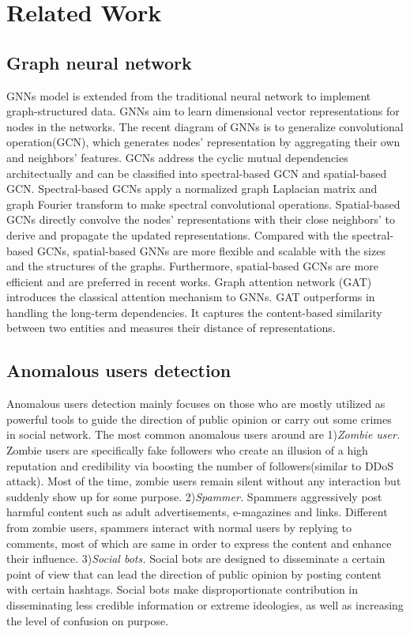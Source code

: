 \documentclass[conference]{IEEEtran}
\theoremstyle{definition}
\begin{document}
\section{Related Work}\label{sec:related}
\subsection{Graph neural network}
GNNs\cite{scarselli2008graph} model is extended from the traditional neural network to implement graph-structured data. GNNs aim to learn  dimensional vector representations for nodes in the networks. The recent diagram of GNNs is to generalize convolutional operation(GCN)\cite{peng2019hierarchical}, which generates nodes' representation by aggregating their own and neighbors' features. GCNs address the cyclic mutual dependencies architectually and can be classified into spectral-based GCN and spatial-based GCN. Spectral-based GCNs\cite{peng2019fine} apply a normalized graph Laplacian matrix and graph Fourier transform to make spectral convolutional operations. Spatial-based GCNs directly convolve the nodes' representations with their close neighbors' to derive and propagate the updated representations. Compared with the spectral-based GCNs, spatial-based GNNs are more flexible and scalable with the sizes and the structures of the graphs. Furthermore, spatial-based GCNs are more efficient and are preferred in recent works\cite{peng2021lime}. Graph attention network (GAT)~\cite{GAT} introduces the classical attention  mechanism to GNNs. GAT outperforms in handling the long-term dependencies. It captures the content-based similarity between two entities and measures their distance of representations\cite{peng2019hierarchical,cao2021knowledge,peng2020motif}.

\subsection{Anomalous users detection}
Anomalous users detection mainly focuses on those who are mostly utilized as powerful tools to guide the direction of public opinion or carry out some crimes in social network\cite{du2017deeplog}. The most common anomalous users around are 1)\textit{Zombie user.} Zombie users are specifically fake followers who create an illusion of a high reputation and credibility via boosting the number of followers(similar to DDoS attack). Most of the time, zombie users remain silent without any interaction but suddenly show up  for some purpose. 2)\textit{Spammer.} Spammers aggressively post harmful content such as adult advertisements, e-magazines and links\cite{kaghazgaran2019wide}. Different from zombie users, spammers  interact with normal users by replying to comments, most of which are same in order to express the content and enhance their influence. 3)\textit{Social bots.} Social bots are designed to disseminate a certain point of view that can lead the direction of public opinion by posting content with certain hashtags\cite{hernandez2018social}. Social bots make disproportionate contribution in disseminating less credible information or extreme ideologies, as well as increasing the level of confusion on purpose.
\end{document}
